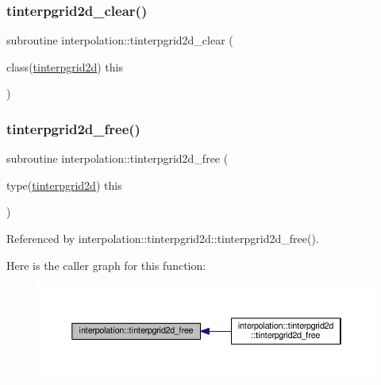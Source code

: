 \subsubsection{\texorpdfstring{tinterpgrid2d\+\_\+clear()}{tinterpgrid2d\_clear()}}
{\footnotesize\ttfamily subroutine interpolation\+::tinterpgrid2d\+\_\+clear (\begin{DoxyParamCaption}\item[{class(\mbox{\hyperlink{structinterpolation_1_1tinterpgrid2d}{tinterpgrid2d}})}]{this }\end{DoxyParamCaption})}

\mbox{\label{namespaceinterpolation_a05968790c56ace3a6aff6f9b81d35b0c}} 
\subsubsection{\texorpdfstring{tinterpgrid2d\+\_\+free()}{tinterpgrid2d\_free()}}
{\footnotesize\ttfamily subroutine interpolation\+::tinterpgrid2d\+\_\+free (\begin{DoxyParamCaption}\item[{type(\mbox{\hyperlink{structinterpolation_1_1tinterpgrid2d}{tinterpgrid2d}})}]{this }\end{DoxyParamCaption})}



Referenced by interpolation\+::tinterpgrid2d\+::tinterpgrid2d\+\_\+free().

Here is the caller graph for this function\+:
\nopagebreak
\begin{figure}[H]
\begin{center}
\leavevmode
\includegraphics[width=350pt]{namespaceinterpolation_a05968790c56ace3a6aff6f9b81d35b0c_icgraph}
\end{center}
\end{figure}
\mbox{\label{namespaceinterpolation_af4593e1e65b9137fa491cdaf9d0682a8}} 
